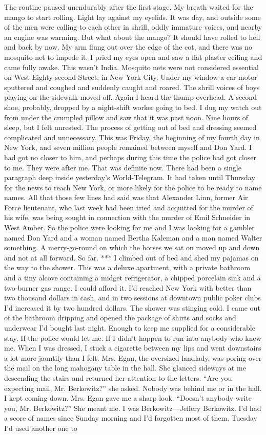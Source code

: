 \documentclass{novel}
\begin{document}
The routine paused unendurably after the first stage. My breath waited for the mango to start rolling. Light lay against my eyelids. It was day, and outside some of the men were calling to each other in shrill, oddly immature voices, and nearby an engine was warming. But what about the mango? It should have rolled to hell and back by now. My arm flung out over the edge of the cot, and there was no mosquito net to impede it. I pried my eyes open and saw a flat plaster ceiling and came fully awake. This wasn’t India. Mosquito nets were not considered essential on West Eighty-second Street; in New York City. Under my window a car motor sputtered and coughed and suddenly caught and roared. The shrill voices of boys playing on the sidewalk moved off. Again I heard the thump overhead. A second shoe, probably, dropped by a night-shift worker going to bed. I dug my watch out from under the crumpled pillow and saw that it was past noon. Nine hours of sleep, but I felt unrested. The process of getting out of bed and dressing seemed complicated and unnecessary. This was Friday, the beginning of my fourth day in New York, and seven million people remained between myself and Don Yard. I had got no closer to him, and perhaps during this time the police had got closer to me. They were after me. That was definite now. There had been a single paragraph deep inside yesterday’s World-Telegram. It had taken until Thursday for the news to reach New York, or more likely for the police to be ready to name names. All that those few lines had said was that Alexander Linn, former Air Force lieutenant, who last week had been tried and acquitted for the murder of his wife, was being sought in connection with the murder of Emil Schneider in West Amber. So the police were looking for me and I was looking for a gambler named Don Yard and a woman named Bertha Kaleman and a man named Walter something. A merry-go-round on which the horses we sat on moved up and down and not at all forward. So far. *** I climbed out of bed and shed my pajamas on the way to the shower. This was a deluxe apartment, with a private bathroom and a tiny alcove containing a midget refrigerator, a chipped porcelain sink and a two-burner gas range. I could afford it. I’d reached New York with better than two thousand dollars in cash, and in two sessions at downtown public poker clubs I’d increased it by two hundred dollars. The shower was stinging cold. I came out of the bathroom dripping and opened the package of shirts and socks and underwear I’d bought last night. Enough to keep me supplied for a considerable stay. If the police would let me. If I didn’t happen to run into anybody who knew me. When I was dressed, I stuck a cigarette between my lips and went downstairs a lot more jauntily than I felt. Mrs. Egan, the oversized landlady, was poring over the mail on the long mahogany table in the hall. She glanced sideways at me descending the stairs and returned her attention to the letters. “Are you expecting mail, Mr. Berkowitz?” she asked. Nobody was behind me or in the hall. I kept coming down. Mrs. Egan gave me a sharp look. “Doesn’t anybody write you, Mr. Berkowitz?” She meant me. I was Berkowitz—Jeffery Berkowitz. I’d had a score of names since Sunday morning and I’d forgotten most of them. Tuesday I’d used another one to 
\end{document}
